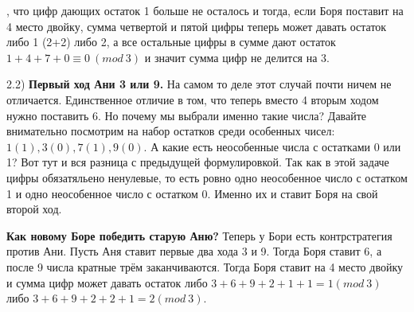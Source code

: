 \newpage

\hspace{3mm}

, что цифр дающих остаток 1 больше не осталось и тогда, если Боря поставит на 4 место двойку, сумма четвертой и пятой цифры теперь может давать остаток либо 1 (2+2) либо 2, а все остальные цифры в сумме дают остаток $1+4+7+0 \equiv 0 \ (mod \ 3)$ и значит сумма цифр не делится на 3.

2.2) \textbf{Первый ход Ани 3 или 9.} На самом то деле этот случай почти ничем не отличается. Единственное отличие в том, что теперь вместо 4 вторым ходом нужно поставить 6. Но почему мы выбрали именно такие числа? Давайте внимательно посмотрим на набор остатков среди особенных чисел: $1(1), 3(0), 7(1), 9(0).$ А какие есть неособенные числа с остатками 0 или 1? Вот тут и вся разница с предыдущей формулировкой. Так как в этой задаче цифры обязатяльено ненулевые, то есть ровно одно неособенное число с остатком 1 и одно неособенное число с остатком 0. Именно их и ставит Боря на свой второй ход.

\textbf{Как новому Боре победить старую Аню?} Теперь у Бори есть контрстратегия против Ани. Пусть Аня ставит первые два хода 3 и 9. Тогда Боря ставит 6, а после 9 числа кратные трём заканчиваются. Тогда Боря ставит на 4 место двойку и сумма цифр может давать остаток либо $3+6+9+2+1+1 = 1 (mod \ 3)$ либо $3+6+9+2+2+1 = 2 (mod \ 3)$.